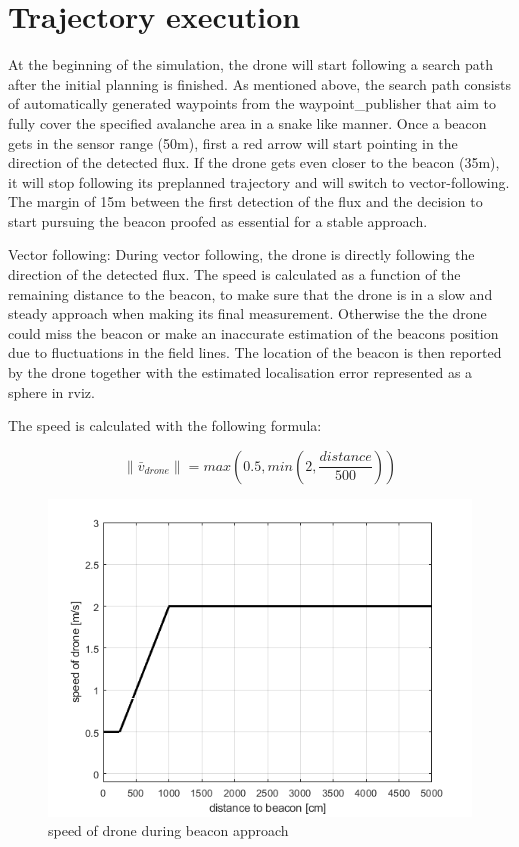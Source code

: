 \documentclass[conference]{IEEEtran}
\begin{document}
\section{Trajectory execution}
At the beginning of the simulation, the drone will start following a search path after the initial planning is finished. As mentioned above, the search path consists of automatically generated waypoints from the waypoint\_publisher that aim to fully cover the specified avalanche area in a snake like manner. Once a beacon gets in the sensor range (50m), first a red arrow will start pointing in the direction of the detected flux. If the drone gets even closer to the beacon (35m), it will stop following its preplanned trajectory and will switch to vector-following. The margin of 15m between the first detection of the flux and the decision to start pursuing the beacon proofed as essential for a stable approach. 

Vector following:
During vector following, the drone is directly following the  direction of the detected flux. The speed is calculated as a function of the remaining distance to the beacon, to make sure that the drone is in a slow and steady approach when making its final measurement. Otherwise the the drone could miss the beacon or make an inaccurate estimation of the beacons position due to fluctuations in the field lines. The location of the beacon is then reported by the drone together with the estimated localisation error represented as a sphere in rviz.

The speed is calculated with the following formula: 

\begin{equation}
\parallel{\bar{v}_{drone}}\parallel = {max(0.5,min(2, \frac{distance}{500}))}
\end{equation}

\begin{figure}[htbpp]
\centerline{\includegraphics[width=1\columnwidth]{plot.png}}
\caption{speed of drone during beacon approach}
\label{fig-3}
\end{figure}
\end{document}
